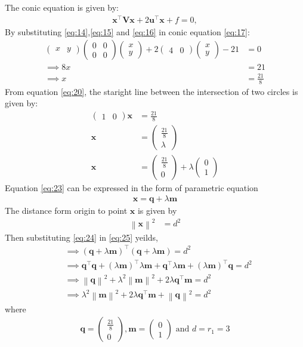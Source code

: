 \documentclass[12pt]{article}
\providecommand{\norm}[1]{\left\lVert#1\right\rVert}
\newcommand{\myvec}[1]{\ensuremath{\begin{pmatrix}#1\end{pmatrix}}}
\let\vec\mathbf
\let\vec\mathbf
\providecommand{\brak}[1]{\ensuremath{\left(#1\right)}}
\providecommand{\brak}[1]{\ensuremath{\left(#1\right)}}
\providecommand{\norm}[1]{\left\lVert#1\right\rVert}
\let\vec\mathbf
\begin{document}
The conic equation is given by:
 \begin{align}
 \vec{x}^\top\vec{V}\vec{x}+2\vec{u}^\top\vec{x}+f=0, 
  \label{eq:17}
 \end{align}
By substituting \eqref{eq:14},\eqref{eq:15} and \eqref{eq:16} in conic equation \eqref{eq:17}:
\begin{align}
	\myvec{x&y}\myvec{0&0\\0&0}\myvec{x\\y}+2\myvec{4&0}\myvec{x\\y}-21&=0\\
\implies	8x&=21\\
\implies	x&=\frac{21}{8}
\label{eq:20}
\end{align}
From equation \eqref{eq:20}, the staright line between the intersection of two circles is given by:
\begin{align}
\myvec{1&0}\vec{x}&=\frac{21}{8}\\
\vec{x}&=\myvec{\frac{21}{8}\\\lambda}\\
\vec{x}&=\myvec{\frac{21}{8}\\0}+\lambda\myvec{0\\1}\label{eq:23}
\end{align}
		Equation \eqref{eq:23} can be expressed in the form of parametric equation
\begin{align}
	\vec{x}=\vec{q}+\lambda\vec{m}\label{eq:24}
\end{align}
The distance form origin to point $\vec{x}$ is given by
\begin{align}
	\norm{\vec{x}}^2&=d^2\label{eq:25}
\end{align}
		Then substituting \eqref{eq:24} in \eqref{eq:25} yeilds,
\begin{align}
	&\implies\brak{\vec{q}+\lambda\vec{m}}^{\top}\brak{\vec{q}+\lambda\vec{m}}=d^2\\
	&\implies \vec{q}^{\top}\vec{q}+\brak{\lambda\vec{m}}^{\top}\lambda\vec{m}+\vec{q}^{\top}\lambda\vec{m}+\brak{\lambda\vec{m}}^{\top}\vec{q}=d^2\\
	&\implies \norm{\vec{q}}^2+\lambda^2\norm{\vec{m}}^2+2\lambda\vec{q}^{\top}\vec{m}=d^2\\
	&\implies \lambda^2\norm{\vec{m}}^2+2\lambda\vec{q}^{\top}\vec{m}+\norm{\vec{q}}^2=d^2\label{eq:29}
\end{align}
where
\begin{align}
	\vec{q}=\myvec{\frac{21}{8}\\0},\vec{m}=\myvec{0\\1} \text{ and } d=r_1=3
	\label{eq:30}
\end{align}
\end{document}
